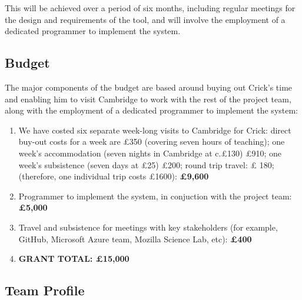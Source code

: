 \documentclass[a4paper,11pt]{article}
\begin{document}
This will be achieved over a period of six months, including regular
meetings for the design and requirements of the tool, and will involve
the employment of a dedicated programmer to implement the system.






\subsection*{Budget}

The major components of the budget are based around buying out Crick's
time and enabling him to visit Cambridge to work with the rest of the
project team, along with the employment of a dedicated programmer to
implement the system:

\begin{enumerate}
\item We have costed six separate week-long visits to Cambridge for
Crick: direct buy-out costs for a week are \pounds 350 (covering seven
hours of teaching); one week's accommodation (seven nights in
Cambridge at c.\pounds 130) \pounds 910; one week's subsistence (seven days at \pounds 25) \pounds 200; round trip travel: \pounds
180; (therefore, one individual trip costs \pounds 1600): \hfill {\textbf{\pounds 9,600}}

\item Programmer to implement the system, in conjuction with the
  project team: \hfill {\textbf{\pounds 5,000}}

\item Travel and subsistence for meetings with key stakeholders (for
  example, GitHub, Microsoft Azure team, Mozilla Science Lab, etc):
  \hfill {\textbf{\pounds 400}}

\item {\textbf{GRANT TOTAL: \hfill \pounds 15,000}}
\end{enumerate}

\subsection*{Team Profile}
\end{document}
